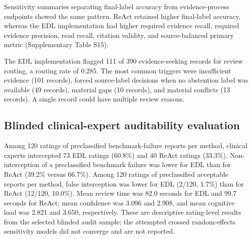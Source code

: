 \documentclass[11pt,a4paper]{article}
\begin{document}
Sensitivity summaries separating final-label accuracy from evidence-process endpoints showed the same pattern. ReAct retained higher final-label accuracy, whereas the EDL implementation had higher required evidence recall, required evidence precision, read recall, citation validity, and source-balanced primary metric (Supplementary Table S15).

The EDL implementation flagged 111 of 390 evidence-seeking records for review routing, a routing rate of 0.285. The most common triggers were insufficient evidence (101 records), forced source-label decisions when no abstention label was available (49 records), material gaps (10 records), and material conflicts (13 records). A single record could have multiple review reasons.

\subsection{Blinded clinical-expert auditability evaluation}

Among 120 ratings of preclassified benchmark-failure reports per method, clinical experts intercepted 73 EDL ratings (60.8\%) and 40 ReAct ratings (33.3\%). Non-interception of a preclassified benchmark failure was lower for EDL than for ReAct (39.2\% versus 66.7\%). Among 120 ratings of preclassified acceptable reports per method, false interception was lower for EDL (2/120, 1.7\%) than for ReAct (12/120, 10.0\%). Mean review time was 82.0 seconds for EDL and 99.7 seconds for ReAct; mean confidence was 3.096 and 2.908, and mean cognitive load was 2.821 and 3.650, respectively. These are descriptive rating-level results from the selected blinded audit sample; the attempted crossed random-effects sensitivity models did not converge and are not reported.

\begin{table}[H]
\centering
\caption{Blinded clinical-expert audit outcomes. Values are descriptive rating-level summaries from the selected sample.}
\label{tab:clinical-expert-audit}
\end{table}
\end{document}
